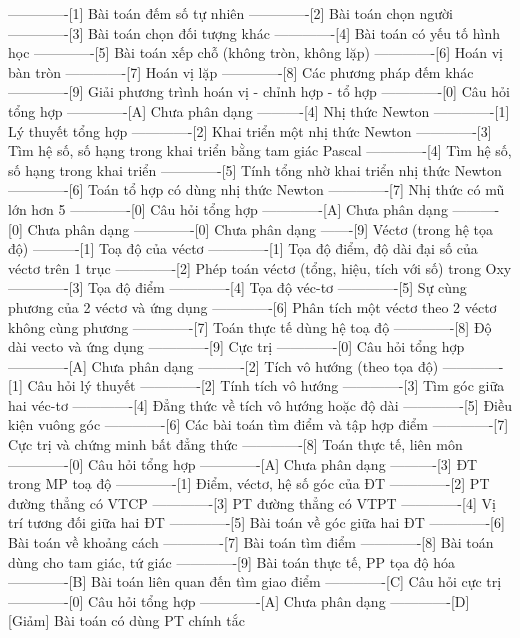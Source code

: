 -------------[1] Bài toán đếm số tự nhiên
-------------[2] Bài toán chọn người
-------------[3] Bài toán chọn đối tượng khác
-------------[4] Bài toán có yếu tố hình học
-------------[5] Bài toán xếp chỗ (không tròn, không lặp)
-------------[6] Hoán vị bàn tròn
-------------[7] Hoán vị lặp
-------------[8] Các phương pháp đếm khác
-------------[9] Giải phương trình hoán vị - chỉnh hợp -  tổ hợp
-------------[0] Câu hỏi tổng hợp
-------------[A] Chưa phân dạng
----------[4] Nhị thức Newton
-------------[1] Lý thuyết tổng hợp 
-------------[2] Khai triển một nhị thức Newton
-------------[3] Tìm hệ số, số hạng trong khai triển bằng tam giác Pascal
-------------[4] Tìm hệ số, số hạng trong khai triển
-------------[5] Tính tổng nhờ khai triển nhị thức Newton
-------------[6] Toán tổ hợp có dùng nhị thức Newton
-------------[7] Nhị thức có mũ lớn hơn 5
-------------[0] Câu hỏi tổng hợp
-------------[A] Chưa phân dạng
----------[0] Chưa phân dạng
-------------[0] Chưa phân dạng
-------[9] Véctơ (trong hệ tọa độ)
----------[1] Toạ độ của véctơ
-------------[1] Tọa độ điểm, độ dài đại số của véctơ trên 1 trục
-------------[2] Phép toán véctơ (tổng, hiệu, tích với số) trong Oxy
-------------[3] Tọa độ điểm 
-------------[4] Tọa độ véc-tơ
-------------[5] Sự cùng phương của 2 véctơ và ứng dụng
-------------[6] Phân tích một véctơ theo 2 véctơ không cùng phương
-------------[7] Toán thực tế dùng hệ toạ độ
-------------[8] Độ dài vecto và ứng dụng
-------------[9] Cực trị
-------------[0] Câu hỏi tổng hợp
-------------[A] Chưa phân dạng
----------[2] Tích vô hướng (theo tọa độ)
-------------[1] Câu hỏi lý thuyết
-------------[2] Tính tích vô hướng
-------------[3] Tìm góc giữa hai véc-tơ
-------------[4] Đẳng thức về tích vô hướng hoặc độ dài
-------------[5] Điều kiện vuông góc
-------------[6] Các bài toán tìm điểm và tập hợp điểm
-------------[7] Cực trị và chứng minh bất đẳng thức
-------------[8] Toán thực tế, liên môn
-------------[0] Câu hỏi tổng hợp
-------------[A] Chưa phân dạng
----------[3] ĐT trong MP toạ độ
-------------[1] Điểm, véctơ, hệ số góc của ĐT
-------------[2] PT đường thẳng có VTCP
-------------[3] PT đường thẳng có VTPT
-------------[4] Vị trí tương đối giữa hai ĐT
-------------[5] Bài toán về góc giữa hai ĐT
-------------[6] Bài toán về khoảng cách
-------------[7] Bài toán tìm điểm
-------------[8] Bài toán dùng cho tam giác, tứ giác
-------------[9] Bài toán thực tế, PP tọa độ hóa
-------------[B] Bài toán liên quan đến tìm giao điểm
-------------[C] Câu hỏi cực trị
-------------[0] Câu hỏi tổng hợp
-------------[A] Chưa phân dạng
-------------[D] [Giảm] Bài toán có dùng PT chính tắc
